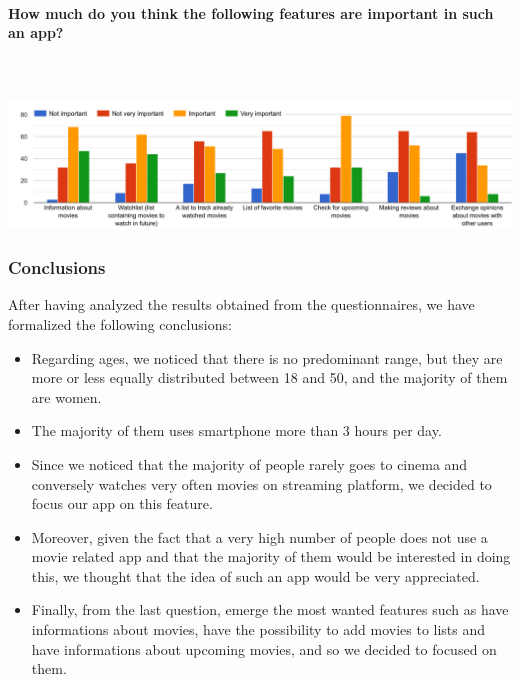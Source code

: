 \documentclass[12pt, a4paper]{article}
\numberwithin{figure}{section}
\begin{document}
\paragraph{How much do you think the following features are important in such an app?}\mbox{}\\\\
\includegraphics[width=1\textwidth]{Images/features.png}\\

\subsubsection{Conclusions}
After having analyzed the results obtained from the questionnaires, we have formalized the following conclusions:
\begin{itemize}
	\item {Regarding ages, we noticed that there is no predominant range, but they 
	are more or less equally distributed between 18 and 50, and the majority 
	of them are women.}
	\item {The majority of them uses smartphone more than 3 hours per day.}
	\item {Since we noticed that the majority of people rarely goes to cinema and 
	conversely watches very often movies on streaming platform, we decided to focus 
	our app on this feature.}
	\item {Moreover, given the fact that a very high number of people does not use 
	a movie related app and that the majority of them would be interested in doing 
	this, we thought that the idea of such an app would be very appreciated.}
	\item {Finally, from the last question, emerge the most wanted features such 
	as have informations about movies, have the possibility to add movies to lists 
	and have informations about upcoming movies, and so we decided to focused on them.}
\end{itemize}



\end{document}
